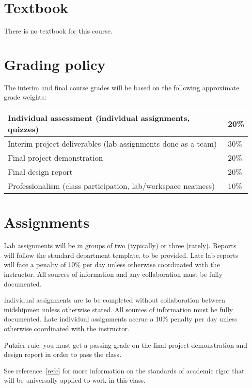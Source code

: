 \documentclass[11pt,courier]{navymemo}
\begin{document}
\section{Textbook} There is no textbook for this course.
 
\section{Grading policy} The interim and final course grades will be based on the following approximate grade weights:
\begin{table}[h]
\begin{center}
\begin{tabular}{|l|l|}\hline
Individual assessment (individual assignments, quizzes) & 20\% \\\hline
Interim project deliverables (lab assignments done as a team) & 30\% \\ \hline
Final project demonstration & 20\% \\ \hline
Final design report & 20\% \\ \hline
Professionalism (class participation, lab/workspace neatness) & 10\% \\ \hline
\end{tabular}
\end{center}
\end{table}

\section{Assignments} Lab assignments will be in groups of two (typically) or three (rarely). Reports will follow the standard department template, to be provided. Late lab reports will face a penalty of 10\% per day unless otherwise coordinated with the instructor. All sources of information and any collaboration must be fully documented.
 
Individual assignments are to be completed without collaboration between midshipmen unless otherwise stated. All sources of information must be fully documented. Late individual assignments accrue a 10\% penalty per day unless otherwise coordinated with the instructor.
 
Putzier rule: you must get a passing grade on the final project demonstration and design report in order to pass the class.

See reference~\ref{refc} for more information on the standards of academic rigor that will be universally applied to work in this class.
 
\end{document}
